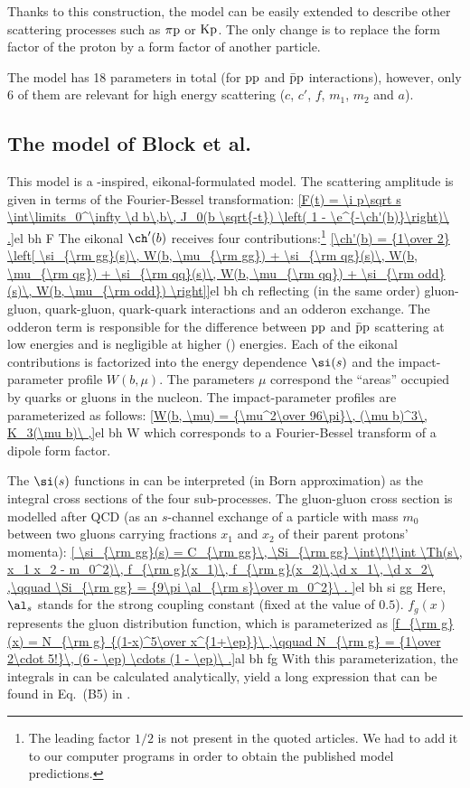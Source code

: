Thanks to this construction, the model can be easily extended to describe other scattering processes such as $\rm \pi p$ or $\rm Kp$. The only change is to replace the form factor of the proton by a form factor of another particle.

The model has 18 parameters in total (for $\rm pp$ and $\rm \bar p p$ interactions), however, only 6 of them are relevant for high energy scattering ($c$, $c'$, $f$, $m_1$, $m_2$ and $a$).



\subsection{The model of Block et al.}

This model  is a -inspired, eikonal-formulated model. The scattering amplitude is given in terms of the Fourier-Bessel transformation:
\eqref{F(t) = \i p\sqrt s \int\limits_0^\infty \d b\,b\, J_0(b \sqrt{-t}) \left( 1 - \e^{-\ch'(b)}\right)\ .}{el bh F}
The eikonal $\ch'(b)$ receives four contributions:\footnote{%
The leading factor $1/2$ is not present in the quoted articles. We had to add it to our computer programs in order to obtain the published model predictions.
}
\eqref{\ch'(b) = {1\over 2} \left[
	\si_{\rm gg}(s)\, W(b, \mu_{\rm gg}) 
	+ \si_{\rm qg}(s)\, W(b, \mu_{\rm qg}) 
	+ \si_{\rm qq}(s)\, W(b, \mu_{\rm qq}) 
	+ \si_{\rm odd}(s)\, W(b, \mu_{\rm odd}) 
\right]}{el bh ch}
reflecting (in the same order) gluon-gluon, quark-gluon, quark-quark interactions and an odderon exchange. The odderon term is responsible for the difference between $\rm pp$ and $\rm\bar pp$ scattering at low energies and is negligible at higher () energies. Each of the eikonal contributions is factorized into the energy dependence $\si(s)$ and the impact-parameter profile $W(b, \mu)$. The parameters $\mu$ correspond the ``areas'' occupied by quarks or gluons in the nucleon. The impact-parameter profiles are parameterized as follows:
\eqref{W(b, \mu) = {\mu^2\over 96\pi}\, (\mu b)^3\, K_3(\mu b)\ ,}{el bh W}
which corresponds to a Fourier-Bessel transform of a dipole form factor.

The $\si(s)$ functions in  can be interpreted (in Born approximation) as the integral cross sections of the four sub-processes. The gluon-gluon cross section is modelled after QCD (as an $s$-channel exchange of a particle with mass $m_0$ between two gluons carrying fractions $x_1$ and $x_2$ of their parent protons' momenta):
\eqref{
	\si_{\rm gg}(s) = C_{\rm gg}\, \Si_{\rm gg} \int\!\!\int \Th(s\, x_1 x_2 - m_0^2)\, f_{\rm g}(x_1)\, f_{\rm g}(x_2)\,\d x_1\, \d x_2\ ,\qquad
	\Si_{\rm gg} = {9\pi \al_{\rm s}\over m_0^2}\ .
}{el bh si gg}
Here, $\al_s$ stands for the strong coupling constant (fixed at the value of $0.5$). $f_g(x)$ represents the gluon distribution function, which is parameterized as
\eqref{f_{\rm g}(x) = N_{\rm g} {(1-x)^5\over x^{1+\ep}}\ ,\qquad N_{\rm g} = {1\over 2\cdot 5!}\, (6 - \ep) \cdots (1 - \ep)\ .}{al bh fg} 
With this parameterization, the integrals in  can be calculated analytically, yield a long expression that can be found in Eq.~(B5) in .

